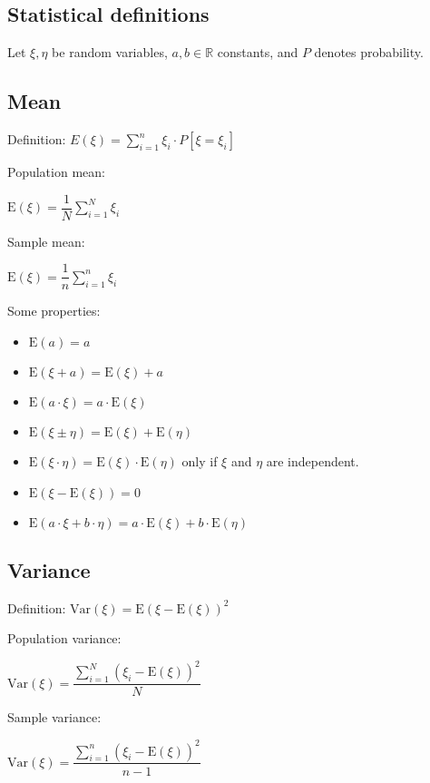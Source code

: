 \documentclass[10pt, a4paper, landscape]{extarticle}
\newcommand{\E}{\mathrm{E}}
\newcommand{\Var}{\mathrm{Var}}
\begin{document}
\begin{multicols}{3}
\columnbreak

\section*{Statistical definitions}

Let $\xi, \eta$ be random variables, $a, b \in \mathbb{R}$ constants, and $P$ denotes probability.

\subsection*{Mean}

Definition: \quad $E(\xi) = \sum_{i=1}^{n} \xi_i \cdot P[\xi = \xi_i]$

\begin{multicols}{2}
	Population mean:
	\begin{center}
		$\E(\xi) = \dfrac{1}{N} \sum_{i=1}^{N} \xi_i$
	\end{center}
\columnbreak
	Sample mean:
	\begin{center}
		$\E(\xi) = \dfrac{1}{n} \sum_{i=1}^{n} \xi_i$
	\end{center}
\end{multicols}

Some properties:

\begin{itemize}[leftmargin=*]
	\item $\E(a) = a$
	\item $\E(\xi + a) = \E(\xi) + a$
	\item $\E(a \cdot \xi) = a \cdot \E(\xi)$
	\item $\E(\xi \pm \eta) = \E(\xi) + \E(\eta)$
	\item $\E(\xi \cdot \eta) = \E(\xi) \cdot \E(\eta)$ \quad only if $\xi$ and $\eta$ are independent.
	\item $\E(\xi - \E(\xi)) = 0$
	\item $\E(a \cdot \xi + b \cdot \eta) = a \cdot \E(\xi) + b \cdot \E(\eta)$
\end{itemize}

\subsection*{Variance}

Definition: \quad $\Var(\xi) = \E(\xi - \E(\xi))^2$

\begin{multicols}{2}
	Population variance:
	\begin{center}
		$\Var(\xi) = \dfrac{\sum_{i=1}^{N} (\xi_i - \E(\xi))^2}{N}$
	\end{center}
\columnbreak
	Sample variance:
	\begin{center}
		$\Var(\xi) = \dfrac{\sum_{i=1}^{n} (\xi_i - \E(\xi))^2}{n - 1}$
	\end{center}
\end{multicols}


\end{multicols}
\end{document}

